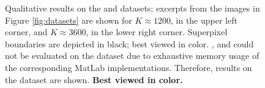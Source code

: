 \begin{figure}
\begin{subfigure}[b]{0.129\textwidth}
    \end{subfigure}
    \begin{subfigure}[b]{0.02\textwidth}
        \hphantom{aa}
    \end{subfigure}
    \begin{subfigure}[b]{0.1375\textwidth}
        \hphantom{aaaaaaaaaaaaaaaaaaaaaaaaaaaaaii}
    \end{subfigure}
    \begin{subfigure}[b]{0.129\textwidth}
        \hphantom{aaaaaaaaaaaaaaaaaaaaaaaaaaa}
    \end{subfigure}
    \begin{subfigure}[b]{0.02\textwidth}
        \hphantom{aa}
    \end{subfigure}
    \begin{subfigure}[b]{0.1375\textwidth}
        \hphantom{aaaaaaaaaaaaaaaaaaaaaaaaaaaaii}
    \end{subfigure}
    \begin{subfigure}[b]{0.129\textwidth}
        \hphantom{aaaaaaaaaaaaaaaaaaaaaaaaaaa}
    \end{subfigure}
	\caption{Qualitative results on the \NYU and \SUNRGBD datasets; excerpts from the images
	in Figure \ref{fig:datasets} are shown for $K \approx 1200$, in the upper left corner,
	and $K \approx 3600$, in the lower right corner. Superpixel boundaries are depicted
	in black; best viewed in color.
    \NC, \RW and \SEAW could not be evaluated on the \SUNRGBD dataset due to
    exhaustive memory usage of the corresponding MatLab implementations.
    Therefore, results on the \NYU dataset are shown.
	\textbf{Best viewed in color.}
	}
	\label{fig:appendix-experiments-qualitative-nyuv2-sunrgbd}
\end{figure}

